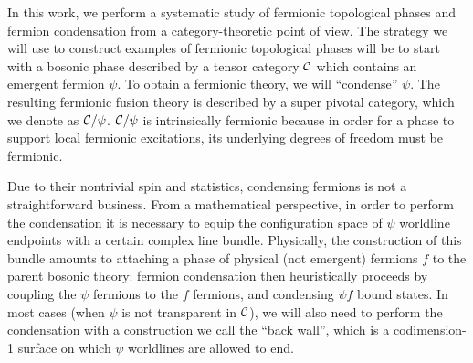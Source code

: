 In this work, we perform a systematic study of fermionic topological phases and fermion condensation from a category-theoretic point of view. 
The strategy we will use to construct examples of fermionic topological phases will be to start with 
a bosonic phase described by a tensor category $\mathcal{C}$
which contains an emergent fermion $\psi$.
To obtain a fermionic theory, we will ``condense'' $\psi$.
The resulting fermionic fusion theory is described by a super pivotal category, which we denote
as $\mathcal{C} / \psi$.
$\mathcal{C}/\psi$ is intrinsically fermionic because in order for a phase to support local fermionic excitations, 
its underlying degrees of freedom must be fermionic. 

Due to their nontrivial spin and statistics, condensing fermions is not a straightforward business. 
From a mathematical perspective, in order to perform the condensation it is necessary to equip the configuration 
space of $\psi$ worldline endpoints with a certain complex line bundle. 
Physically, the construction of this bundle amounts to attaching a phase of physical (not emergent) fermions $f$ 
to the parent bosonic theory: 
fermion condensation then heuristically proceeds by coupling the $\psi$ fermions to 
the $f$ fermions, and condensing $\psi f$ bound states. 
In most cases (when $\psi$ is not transparent in $\mathcal{C}$), we will also need to perform 
the condensation with a construction we call the ``back wall'', which is a codimension-1 surface 
on which $\psi$ worldlines are allowed to end. 

